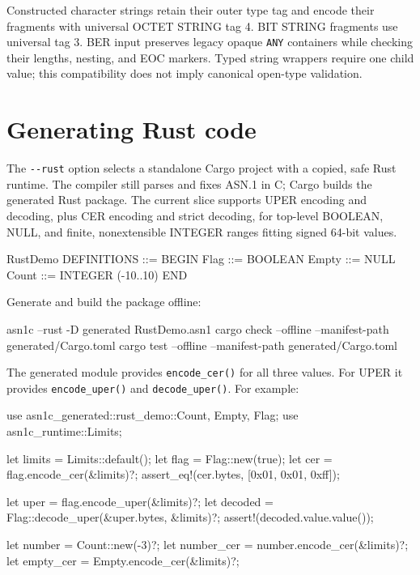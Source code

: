 \documentclass[english,oneside,12pt]{book}
\begin{document}
Constructed character strings retain their outer type tag and encode their
fragments with universal OCTET STRING tag 4. BIT STRING fragments use universal
tag 3. BER input preserves legacy opaque \texttt{ANY} containers while checking
their lengths, nesting, and EOC markers. Typed string wrappers require one
child value; this compatibility does not imply canonical open-type validation.

\section{\label{sec:Rust-output}Generating Rust code}

The \texttt{-{}-rust} option selects a standalone Cargo project with a copied,
safe Rust runtime. The compiler still parses and fixes ASN.1 in C; Cargo builds
the generated Rust package. The current slice supports UPER encoding and
decoding, plus CER encoding and strict decoding, for top-level BOOLEAN, NULL, and finite,
nonextensible INTEGER ranges fitting signed 64-bit values.

\begin{asn}[literate={-}{{\char45}}1]
RustDemo DEFINITIONS ::= BEGIN
Flag ::= BOOLEAN
Empty ::= NULL
Count ::= INTEGER (-10..10)
END
\end{asn}

Generate and build the package offline:

\begin{bash}[literate={-}{{\char45}}1]
asn1c --rust -D generated RustDemo.asn1
cargo check --offline --manifest-path generated/Cargo.toml
cargo test --offline --manifest-path generated/Cargo.toml
\end{bash}

The generated module provides \texttt{encode\_cer()} for all three values.
For UPER it provides \texttt{encode\_uper()} and \texttt{decode\_uper()}.
For example:

\begin{codesample}[basicstyle=\scriptsize\listingfont,literate={-}{{\char45}}1]
use asn1c_generated::rust_demo::{Count, Empty, Flag};
use asn1c_runtime::Limits;

let limits = Limits::default();
let flag = Flag::new(true);
let cer = flag.encode_cer(&limits)?;
assert_eq!(cer.bytes, [0x01, 0x01, 0xff]);

let uper = flag.encode_uper(&limits)?;
let decoded = Flag::decode_uper(&uper.bytes, &limits)?;
assert!(decoded.value.value());

let number = Count::new(-3)?;
let number_cer = number.encode_cer(&limits)?;
let empty_cer = Empty.encode_cer(&limits)?;
\end{codesample}
\end{document}
